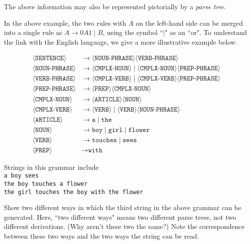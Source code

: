 \bigskip
The above information may also be represented pictorially by a \textit{parse tree}.

\vspace{3mm}
In the above example, the two rules with $A$ on the left-hand side can be merged into a single rule as  $A\to 0A1\mid B$, using the symbol ``$|$" as an ``or". To understand the link with the English language, we give a more illustrative example below.
\begin{example}
\begin{align*}
    \langle\texttt{SENTENCE}\rangle &\to \langle\texttt{NOUN-PHRASE}\rangle\langle\texttt{VERB-PHRASE}\rangle \\
    \langle\texttt{NOUN-PHRASE}\rangle &\to \langle\texttt{CMPLX-NOUN}\rangle\mid\langle\texttt{CMPLX-NOUN}\rangle\langle\texttt{PREP-PHRASE}\rangle \\
    \langle\texttt{VERB-PHRASE}\rangle&\to\langle\texttt{CMPLX-VERB}\rangle\mid\langle\texttt{CMPLX-VERB}\rangle\langle\texttt{PREP-PHRASE}\rangle \\
    \langle\texttt{PREP-PHRASE}\rangle&\to\langle\texttt{PREP}\rangle\langle\texttt{CMPLX-NOUN}\rangle \\
    \langle\texttt{CMPLX-NOUN}\rangle&\to\langle\texttt{ARTICLE}\rangle\langle\texttt{NOUN}\rangle \\
    \langle\texttt{CMPLX-VERB}\rangle&\to\langle\texttt{VERB}\rangle\mid\langle\texttt{VERB}\rangle\langle\texttt{NOUN-PHRASE}\rangle \\
    \langle\texttt{ARTICLE}\rangle&\to\texttt{a}\mid\texttt{the} \\
    \langle\texttt{NOUN}\rangle&\to\texttt{boy}\mid\texttt{girl}\mid\texttt{flower} \\
    \langle\texttt{VERB}\rangle&\to\texttt{touches}\mid\texttt{sees}\\
    \langle\texttt{PREP}\rangle&\to\texttt{with}
\end{align*}

Strings in this grammar include\\
\quad \texttt{a boy sees} \\    
\quad \texttt{the boy touches a flower} \\
\quad \texttt{the girl touches the boy with the flower}
\end{example}

\begin{exercise}
Show two different ways in which the third string in the above grammar can be generated. Here, ``two different ways" means two different parse trees, not two different derivations. (Why aren't these two the same?) Note the correspondence between these two ways and the two ways the string can be read.
\end{exercise}

